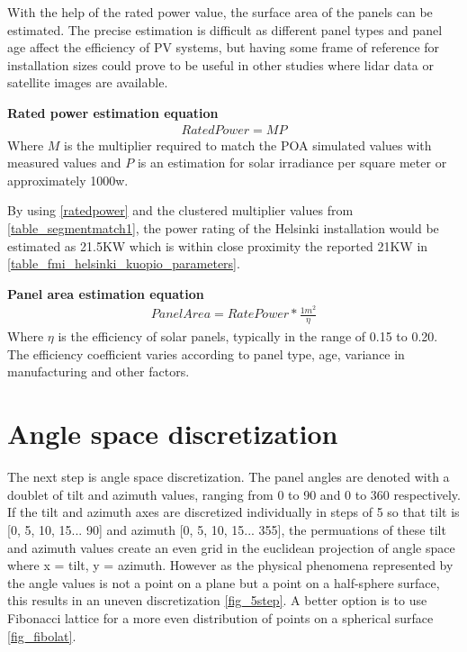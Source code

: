 With the help of the rated power value, the surface area of the panels can be estimated. The precise estimation is difficult as different panel types and panel age affect the efficiency of PV systems, but having some frame of reference for installation sizes could prove to be useful in other studies where lidar data or satellite images are available.

\noindent \textbf{Rated power estimation equation}
\begin{align}
	RatedPower =  MP \label{ratedpower}
\end{align}
Where $M$ is the multiplier required to match the POA simulated values with measured values and $P$ is an estimation for solar irradiance per square meter or approximately 1000w. 

\vspace{5mm}
\noindent By using \ref{ratedpower} and the clustered multiplier values from \ref{table_segmentmatch1}, the power rating of the Helsinki installation would be estimated as 21.5KW which is within close proximity the reported 21KW in \ref{table_fmi_helsinki_kuopio_parameters}.





\noindent \textbf{Panel area estimation equation}
\begin{align}
	PanelArea =  RatePower * \frac{1m^2}{\eta}
\end{align}
Where $\eta$ is the efficiency of solar panels, typically in the range of 0.15 to 0.20. The efficiency coefficient varies according to panel type, age, variance in manufacturing and other factors.
\vspace{5mm}

\newpage
\section{Angle space discretization}\label{angle_space_discretization}
The next step is angle space discretization. The panel angles are denoted with a doublet of tilt and azimuth values, ranging from 0 to 90 and 0 to 360 respectively. If the tilt and azimuth axes are discretized individually in steps of 5 so that tilt is [0, 5, 10, 15... 90] and azimuth [0, 5, 10, 15... 355], the permuations of these tilt and azimuth values create an even grid in the euclidean projection of angle space where x = tilt, y = azimuth. However as the physical phenomena represented by the angle values is not a point on a plane but a point on a half-sphere surface, this results in an uneven discretization \ref{fig_5step}. A better option is to use Fibonacci lattice \cite{fibolat2} for a more even distribution of points on a spherical surface \ref{fig_fibolat}.

